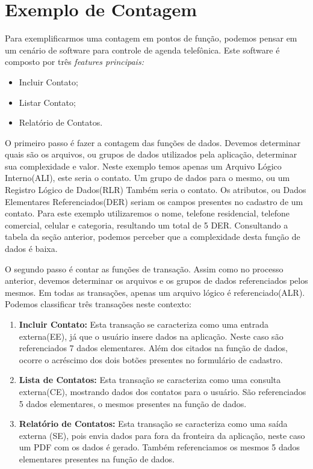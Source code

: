 \section{Exemplo de Contagem}

Para exemplificarmos uma contagem em pontos de função, podemos pensar em um cenário de software para controle de agenda telefônica. Este software é composto por três \textit{features principais:}

\begin{itemize}
	\item Incluir Contato;
	\item Listar Contato;
	\item Relatório de Contatos.
\end{itemize}

O primeiro passo é fazer a contagem das funções de dados. Devemos determinar quais são os arquivos, ou grupos de dados utilizados pela aplicação, determinar sua complexidade e valor. Neste exemplo temos apenas um Arquivo Lógico Interno(ALI), este seria o contato. Um grupo de dados para o mesmo, ou um Registro Lógico de Dados(RLR) Também seria o contato. Os atributos, ou Dados Elementares Referenciados(DER) seriam os campos presentes no cadastro de um contato. Para este exemplo utilizaremos o nome, telefone residencial, telefone comercial, celular e categoria, resultando um total de 5 DER. Consultando a tabela da seção anterior, podemos perceber que a complexidade desta função de dados é baixa.

O segundo passo é contar as funções de transação. Assim como no processo anterior, devemos determinar os arquivos e os grupos de dados referenciados pelos mesmos. Em todas as transações, apenas um arquivo lógico é referenciado(ALR). Podemos classificar três transações neste contexto:

\begin{enumerate}
	\item \textbf{Incluir Contato:} Esta transação se caracteriza como uma entrada externa(EE), já que o usuário insere dados na aplicação. Neste caso são referenciados 7 dados elementares. Além dos citados na função de dados, ocorre o acréscimo dos dois botões presentes no formulário de cadastro.

	\item \textbf{Lista de Contatos:} Esta transação se caracteriza como uma consulta externa(CE), mostrando dados dos contatos para o usuário. São referenciados 5 dados elementares, o mesmos presentes na função de dados.

	\item \textbf{Relatório de Contatos:} Esta transação se caracteriza como uma saída externa (SE), pois envia dados para fora da fronteira da aplicação, neste caso um PDF com os dados é gerado. Também referenciamos os mesmos 5 dados elementares presentes na função de dados.
\end{enumerate}


